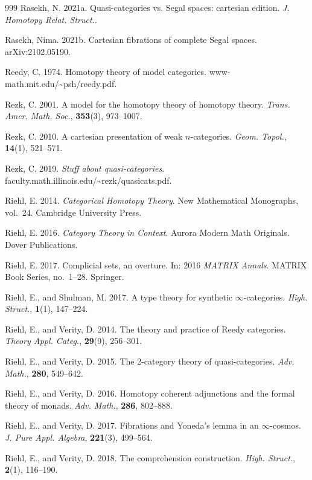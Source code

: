 \begin{thebibliography}{999}
 Rasekh, N. 2021a. Quasi-categories vs. Segal spaces: cartesian
  edition. \emph{J. Homotopy Relat. Struct.}.

 Rasekh, Nima. 2021b. Cartesian fibrations of complete Segal
  spaces. arXiv:2102.05190.

 Reedy, C. 1974. Homotopy theory of model categories.
  www-math.mit.edu/\textasciitilde{}psh/reedy.pdf.

 Rezk, C. 2001. A model for the homotopy theory of homotopy
  theory. \emph{Trans. Amer. Math. Soc.}, \textbf{353}(3), 973--1007.

 Rezk, C. 2010. A cartesian presentation of weak $n$-categories.
  \emph{Geom. Topol.}, \textbf{14}(1), 521--571.

 Rezk, C. 2019. \emph{Stuff about quasi-categories}.
  faculty.math.illinois.edu/\textasciitilde{}rezk/quasicats.pdf.

 Riehl, E. 2014. \emph{Categorical Homotopy Theory}. New
  Mathematical Monographs, vol.~24. Cambridge University Press.

 Riehl, E. 2016. \emph{Category Theory in Context}. Aurora
  Modern Math Originals. Dover Publications.

 Riehl, E. 2017. Complicial sets, an overture. In: 2016
  \emph{MATRIX Annals}. MATRIX Book Series, no.~1--28. Springer.

 Riehl, E., and Shulman, M. 2017. A type theory for synthetic
  $\infty$-categories. \emph{High. Struct.}, \textbf{1}(1), 147--224.

 Riehl, E., and Verity, D. 2014. The theory and practice of
  Reedy categories. \emph{Theory Appl. Categ.}, \textbf{29}(9), 256--301.

 Riehl, E., and Verity, D. 2015. The 2-category theory of
  quasi-categories. \emph{Adv. Math.}, \textbf{280}, 549--642.

 Riehl, E., and Verity, D. 2016. Homotopy coherent adjunctions
  and the formal theory of monads. \emph{Adv. Math.}, \textbf{286}, 802--888.

 Riehl, E., and Verity, D. 2017. Fibrations and Yoneda's lemma
  in an $\infty$-cosmos. \emph{J. Pure Appl. Algebra}, \textbf{221}(3),
  499--564.

 Riehl, E., and Verity, D. 2018. The comprehension construction.
  \emph{High. Struct.}, \textbf{2}(1), 116--190.


\end{thebibliography}
